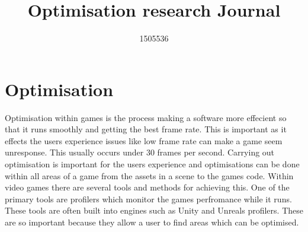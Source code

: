 \documentclass[journal]{IEEEtran}
\begin{document}
%
\title{Optimisation research Journal}

\author{1505536}


\maketitle

\section{Optimisation}
Optimisation within games is the process making a software more effecient so that it runs smoothly and getting the best frame rate.
This is important as it effects the users experience issues like low frame rate can make a game seem unresponse.
This usually occurs under 30 frames per second.%
Carrying out optimisation is important for the users experience and optimisations can be done within all areas of a game from the assets in a scene to the games code.
Within video games there are several tools and methods for achieving this.
One of the primary tools are profilers which monitor the games perfromance while it runs.
These tools are often built into engines such as Unity and Unreals profilers.
These are so important because they allow a user to find areas which can be optimised.
\end{document}
